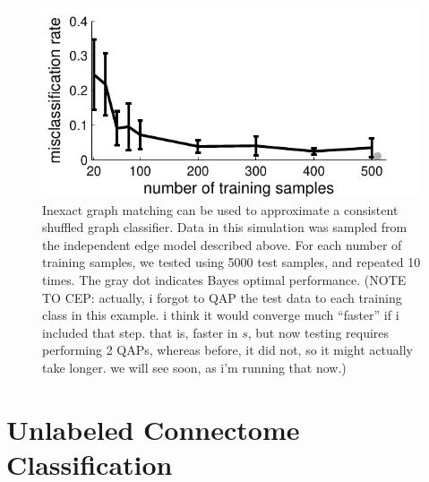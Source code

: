 \documentclass[10pt,journal,cspaper,compsoc]{IEEEtran}
\begin{document}
\begin{figure}[htbp]
	\centering
		\includegraphics[width=1.0\linewidth]{../figs/hetero_easy_n10_MC5000_QAP_vs_n.pdf}
	\caption{Inexact graph matching can be used to approximate a consistent shuffled graph classifier.  Data in this simulation was sampled from the independent edge model described above.  For each number of training samples, we tested using 5000 test samples, and repeated 10 times.  The gray dot indicates Bayes optimal performance. (NOTE TO CEP: actually, i forgot to QAP the test data to each training class in this example.  i think it would converge much ``faster'' if i included that step. that is, faster in $s$, but now testing requires performing 2 QAPs, whereas before, it did not, so it might actually take longer.  we will see soon, as i'm running that now.)}
	\label{fig:1}
\end{figure}




\section{Unlabeled Connectome Classification} %
\label{sub:connectome_classification}
\end{document}
